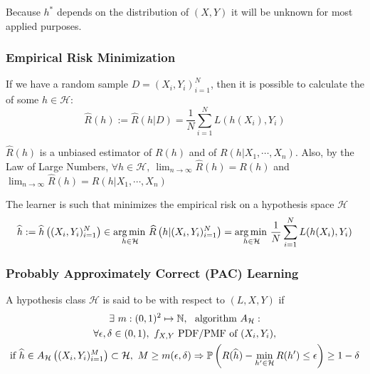 Because $h^*$ depends on the distribution of $(X,Y)$ it will be unknown for most applied purposes.

\subsubsection{Empirical Risk Minimization}

If we have a random sample $D=(X_i,Y_i)_{i=1}^N$, then it is possible to calculate the  of some $h\in\mathcal{H}$:
\begin{equation*}
    \widehat{R}(h) := \widehat{R}\left(h|D\right) = \frac{1}{N}\sum_{i=1}^NL(h(X_i),Y_i)
\end{equation*}

$\widehat{R}(h)$ is a unbiased estimator of $R(h)$ and of $R(h|X_1,\cdots, X_n)$. Also, by the Law of Large Numbers, $\forall h\in\mathcal{H},\ \lim_{n\rightarrow\infty}\widehat{R}(h)={R}(h)$ and $\lim_{n\rightarrow\infty}\widehat{R}(h)={R}(h|X_1,\cdots, X_n)$\medskip

The  learner is such that minimizes the empirical risk on a hypothesis space $\mathcal{H}$
\begin{equation*}
    \widehat{h} := \widehat{h}\left((X_i,Y_i)_{i=1}^N\right) \in \operatorname*{arg\,min\,}_{h\in\mathcal{H}}\widehat{R}\left(h|(X_i,Y_i)_{i=1}^N\right) = \operatorname*{arg\,min\,}_{h\in\mathcal{H}} \frac{1}{N}\sum_{i=1}^NL(h(X_i),Y_i)
\end{equation*}

\subsubsection{Probably Approximately Correct (PAC) Learning}
A hypothesis class $\mathcal{H}$ is said to be  with respect to $(L,X,Y)$ if
\begin{multline*}
    \exists\ m:(0,1)^2\mapsto\mathbb{N},\ \text{ algorithm } A_{\mathcal{H}}:\\ \forall \epsilon, \delta\in(0,1),\ f_{X,Y} \text{ PDF/PMF of } (X_i,Y_i), \\
    \text{if } \widehat{h}\in A_{\mathcal{H}}\left((X_i,Y_i)_{i=1}^M\right)\subset\mathcal{H},\ M\geq m(\epsilon,\delta) \Rightarrow 
    \operatorname{\mathbb{P}}\left(R(\widehat{h})-\min_{h'\in\mathcal{H}}R(h')\leq \epsilon \right)\geq 1-\delta
\end{multline*}